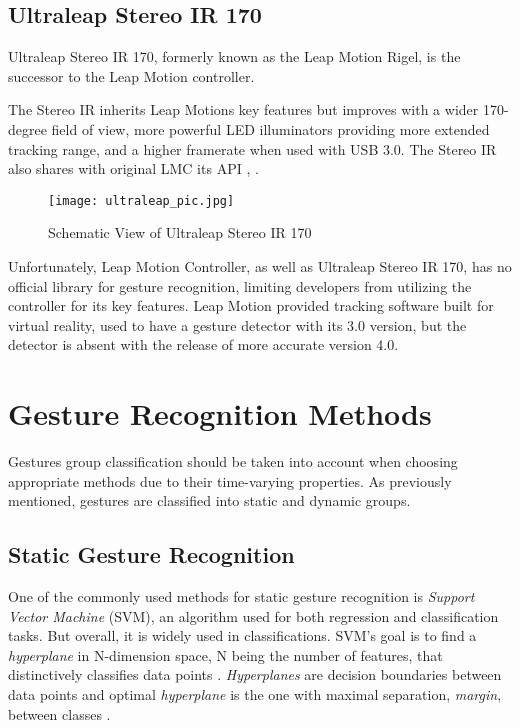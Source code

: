 \subsection{Ultraleap Stereo IR 170}

Ultraleap Stereo IR 170, formerly known as the Leap Motion Rigel, is the successor to the Leap Motion controller.

The Stereo IR inherits Leap Motions key features but improves with a wider 170-degree field of view, more powerful LED illuminators providing more extended tracking range, and a higher framerate when used with USB 3.0. The Stereo IR also shares with original LMC its API \cite{ultraleap}, \cite{ultraleap2}.

\begin{figure}[H]
    \centering
    \texttt{[image: ultraleap\_pic.jpg]}
    \caption{Schematic View of Ultraleap Stereo IR 170 \cite{ultraleap}}
    \label{fig:UltraLeapscheme}
\end{figure}

Unfortunately, Leap Motion Controller, as well as Ultraleap Stereo IR 170, has no official library for gesture recognition, limiting developers from utilizing the controller for its key features. Leap Motion provided tracking software built for virtual reality, used to have a gesture detector with its 3.0 version, but the detector is absent with the release of more accurate version 4.0.


\section{Gesture Recognition Methods
}

Gestures group classification should be taken into account when choosing appropriate methods due to their time-varying properties. As previously mentioned, gestures are classified into static and dynamic groups. 

\subsection{Static Gesture Recognition}

One of the commonly used methods for static gesture recognition is \textit{Support Vector Machine} (SVM), an algorithm used for both regression and classification tasks. But overall, it is widely used in classifications. SVM's goal is to find a \textit{hyperplane} in N-dimension space, N being the number of features, that distinctively classifies data points \cite{svmIntroToML}. \textit{Hyperplanes} are decision boundaries between data points and optimal \textit{hyperplane} is the one with maximal separation, \textit{margin}, between classes \cite{savaris}.

